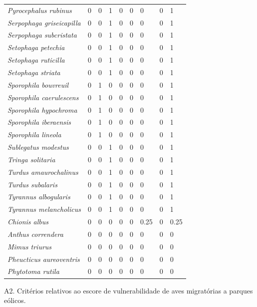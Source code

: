 \documentclass[
  oneside]{scrbook}
\begin{document}
\begin{ThreePartTable}
\begin{longtable}[t]{>{}lrrrrrlrl}
\em{Pyrocephalus rubinus} & 0 & 0 & 1 & 0 & 0 & 0 & 0 & 1\\
\addlinespace
\em{Serpophaga griseicapilla} & 0 & 0 & 1 & 0 & 0 & 0 & 0 & 1\\
\em{Serpophaga subcristata} & 0 & 0 & 1 & 0 & 0 & 0 & 0 & 1\\
\em{Setophaga petechia} & 0 & 0 & 1 & 0 & 0 & 0 & 0 & 1\\
\em{Setophaga ruticilla} & 0 & 0 & 1 & 0 & 0 & 0 & 0 & 1\\
\em{Setophaga striata} & 0 & 0 & 1 & 0 & 0 & 0 & 0 & 1\\
\addlinespace
\em{Sporophila bouvreuil} & 0 & 1 & 0 & 0 & 0 & 0 & 0 & 1\\
\em{Sporophila caerulescens} & 0 & 1 & 0 & 0 & 0 & 0 & 0 & 1\\
\em{Sporophila hypochroma} & 0 & 1 & 0 & 0 & 0 & 0 & 0 & 1\\
\em{Sporophila iberaensis} & 0 & 1 & 0 & 0 & 0 & 0 & 0 & 1\\
\em{Sporophila lineola} & 0 & 1 & 0 & 0 & 0 & 0 & 0 & 1\\
\addlinespace
\em{Sublegatus modestus} & 0 & 0 & 1 & 0 & 0 & 0 & 0 & 1\\
\em{Tringa solitaria} & 0 & 0 & 1 & 0 & 0 & 0 & 0 & 1\\
\em{Turdus amaurochalinus} & 0 & 0 & 1 & 0 & 0 & 0 & 0 & 1\\
\em{Turdus subalaris} & 0 & 0 & 1 & 0 & 0 & 0 & 0 & 1\\
\em{Tyrannus albogularis} & 0 & 0 & 1 & 0 & 0 & 0 & 0 & 1\\
\addlinespace
\em{Tyrannus melancholicus} & 0 & 0 & 1 & 0 & 0 & 0 & 0 & 1\\
\em{Chionis albus} & 0 & 0 & 0 & 0 & 0 & 0.25 & 0 & 0.25\\
\em{Anthus correndera} & 0 & 0 & 0 & 0 & 0 & 0 & 0 & 0\\
\em{Mimus triurus} & 0 & 0 & 0 & 0 & 0 & 0 & 0 & 0\\
\em{Pheucticus aureoventris} & 0 & 0 & 0 & 0 & 0 & 0 & 0 & 0\\
\addlinespace
\em{Phytotoma rutila} & 0 & 0 & 0 & 0 & 0 & 0 & 0 & 0\\*
\end{longtable}
\end{ThreePartTable}

\newpage

A2. Critérios relativos ao escore de vulnerabilidade de aves migratórias a parques eólicos.
\end{document}
